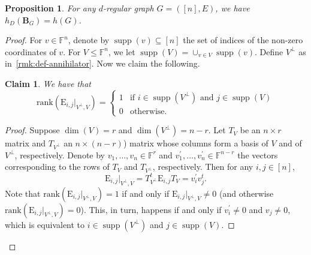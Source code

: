 \documentclass[11pt]{article}
\newtheorem{claim}[theorem]{Claim}
\newtheorem{proposition}[theorem]{Proposition}
\theoremstyle{plain}
\numberwithin{equation}{section}
\theoremstyle{definition}
\newcommand{\F}{\mathbb{F}}
\newcommand{\rk}{\mathrm{rank}}
\DeclareMathOperator{\supp}{supp}
\newcommand{\tuple}[1]{\mathbf{#1}}
\newcommand{\vB}{\tuple{B}}
\newcommand{\E}{\mathrm{E}}
\newcommand{\ann}{V^{\perp}}
\begin{document}
\begin{proposition}\label{prop:graphical-edge}
    For any $d$-regular graph $G=([n],E)$, we have $h_D(\vB_G)=h(G)$.
\end{proposition}
\begin{proof}
    For $v\in\F^n$, denote by $\supp(v)\subseteq[n]$ the set of indices of the non-zero coordinates of $v$. For $V\leq\F^{n}$, we let $\supp(V)=\cup_{v\in V}\supp(v)$. 
    Define $\ann$ as in~\cref{rmk:def-annihilator}. Now we claim the following.
    \begin{claim}\label{claim:rank-Eij}
        We have that
        \[
            \rk(\E_{i,j}|_{\ann,V}) = 
            \begin{cases}
                1&\text{if }i \in \supp(\ann)\text{ and } j \in \supp(V)\\
                0&\text{otherwise.}
            \end{cases}
        \]
    \end{claim}
    \begin{proof}
      Suppose $\dim(V)=r$ and $\dim(\ann)=n-r$. Let
%
%
$T_V$ be an $n\times r$ matrix and $T_{\ann}$ an $n\times (n-r)$) matrix whose
columns form a basis of $V$ and of $\ann$, respectively.  %
      Denote by $v_{1},\dots,v_{n}\in \F^r$ and $v^{\prime}_{1},\dots,v^{\prime}_{n}\in\F^{n-r}$ the vectors corresponding to the rows of $T_V$ and $T_{\ann}$, respectively. Then for any $i,j\in[n]$,
        $$
        \E_{i,j}|_{\ann,V}=T_{\ann}^t\E_{i,j}T_V={v^{\prime}_{i}}v_{j}^{t}.
        $$ 
        Note that $\rk(\E_{i,j}|_{\ann,V})=1$ if and only if $\E_{i,j}|_{\ann,V}\neq0$ (and otherwise $\rk(\E_{i,j}|_{\ann,V})=0$). This, in turn, happens if and only if $v^{\prime}_{i}\neq0$ and $v_{j}\neq0$, which is equivalent to $i\in\supp(\ann)$ and $j\in\supp(V)$. 
    \end{proof}


\end{proof}
\end{document}
